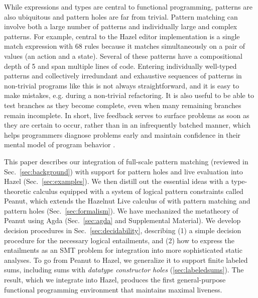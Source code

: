 While expressions and types are central to functional programming, patterns are also ubiquitous and pattern holes are far from trivial. Pattern matching can involve both a large number of patterns and individually large and complex patterns. For example, central to the Hazel editor implementation is a single match expression with 68 rules because it matches simultaneously on a pair of values (an action and a state). Several of these patterns have a compositional depth of 5 and span multiple lines of code. Entering individually well-typed patterns and collectively irredundant and exhaustive sequences of patterns in non-trivial programs like this is not always straightforward, and it is easy to make mistakes, e.g. during a non-trivial refactoring. It is also useful to be able to test branches as they become complete, even when many remaining branches remain incomplete. In short, live feedback serves to surface problems as soon as they are certain to occur, rather than in an infrequently batched manner, which helps programmers diagnose problems early and maintain confidence in their mental model of program behavior \cite{tanimoto2013perspective}.

This paper describes our integration of full-scale pattern matching (reviewed in Sec.~\ref{sec:background}) with support for pattern holes and live evaluation into Hazel (Sec.~\ref{sec:examples}). We then distill out the essential ideas with a type-theoretic calculus equipped with a system of logical pattern constraints called Peanut, which extends the Hazelnut Live calculus of \citet{DBLP:journals/pacmpl/OmarVCH19} with pattern matching and pattern holes (Sec.~\ref{sec:formalism}). We have mechanized the metatheory of Peanut using Agda (Sec.~\ref{sec:agda} and Supplemental Material). We develop decision procedures in Sec.~\ref{sec:decidability}, describing (1) a simple decision procedure for the necessary logical entailments, and (2) how to express the entailments as an SMT problem for integration into more sophisticated static analyses. To go from Peanut to Hazel, we generalize it to support finite labeled sums, including sums with \emph{datatype constructor holes} (\autoref{sec:labeledsums}). The result, which we integrate into Hazel, produces the first general-purpose functional programming environment that maintains maximal liveness.

